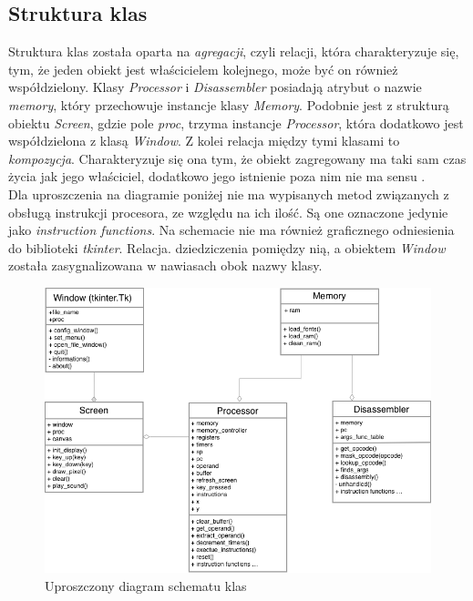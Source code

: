 \subsection{Struktura klas}
Struktura klas została oparta na \textit{agregacji}, czyli relacji, która charakteryzuje się, tym, że jeden obiekt jest właścicielem kolejnego, może być on również współdzielony. Klasy \textit{Processor} i \textit{Disassembler} posiadają atrybut o nazwie \textit{memory}, który przechowuje instancje klasy \textit{Memory}. Podobnie jest z strukturą obiektu \textit{Screen}, gdzie pole \textit{proc}, trzyma instancje \textit{Processor}, która dodatkowo jest współdzielona z klasą \textit{Window}. Z kolei relacja między tymi klasami to \textit{kompozycja}. Charakteryzuje się ona tym, że obiekt zagregowany ma taki sam czas życia jak jego właściciel, dodatkowo jego istnienie poza nim nie ma sensu \cite{Trybulec}. \\

Dla uproszczenia na diagramie poniżej nie ma wypisanych metod związanych z obsługą instrukcji procesora, ze względu na ich ilość. Są one oznaczone jedynie jako \textit{instruction functions}. Na schemacie nie ma również graficznego odniesienia do biblioteki \textit{tkinter}. Relacja. dziedziczenia pomiędzy nią, a obiektem \textit{Window} została zasygnalizowana w nawiasach obok nazwy klasy.

\begin{figure}[!htb]
\begin{center}
	\includegraphics[scale=0.4]{images/class_scheme}
	\caption{Uproszczony diagram schematu klas}
\end{center}
\end{figure}

